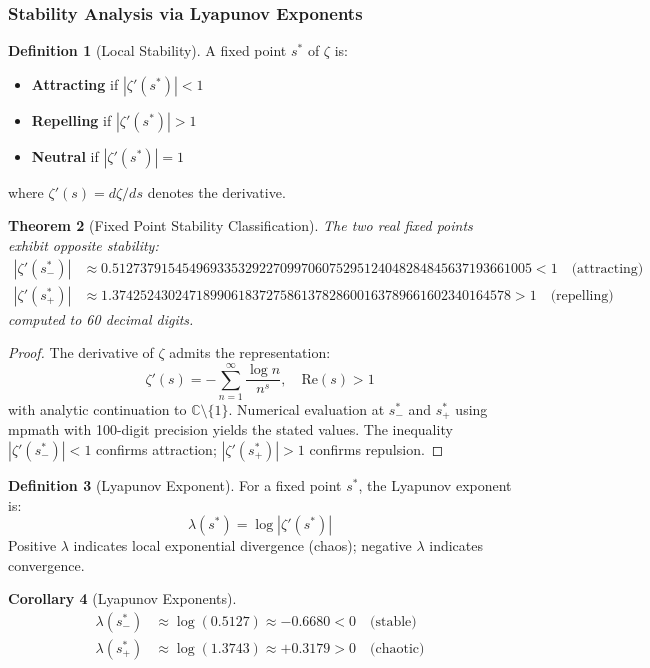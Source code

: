 \documentclass[12pt]{article}
\theoremstyle{plain}
\newtheorem{theorem}{Theorem}[section]
\newtheorem{corollary}[theorem]{Corollary}
\theoremstyle{definition}
\newtheorem{definition}[theorem]{Definition}
\begin{document}
\subsubsection{Stability Analysis via Lyapunov Exponents}

\begin{definition}[Local Stability]
A fixed point $s^*$ of $\zeta$ is:
\begin{itemize}
\item \textbf{Attracting} if $|\zeta'(s^*)| < 1$
\item \textbf{Repelling} if $|\zeta'(s^*)| > 1$
\item \textbf{Neutral} if $|\zeta'(s^*)| = 1$
\end{itemize}
where $\zeta'(s) = d\zeta/ds$ denotes the derivative.
\end{definition}

\begin{theorem}[Fixed Point Stability Classification]\label{thm:fixed_point_stability}
The two real fixed points exhibit opposite stability:
\begin{align}
|\zeta'(s_-^*)| &\approx 0.512737915454969335329227099706075295124048284845637193661005 < 1 \quad \text{(attracting)} \\
|\zeta'(s_+^*)| &\approx 1.374252430247189906183727586137828600163789661602340164578 > 1 \quad \text{(repelling)}
\end{align}
computed to 60 decimal digits.
\end{theorem}

\begin{proof}
The derivative of $\zeta$ admits the representation:
$$\zeta'(s) = -\sum_{n=1}^{\infty} \frac{\log n}{n^s}, \quad \text{Re}(s) > 1$$
with analytic continuation to $\mathbb{C} \setminus \{1\}$. Numerical evaluation at $s_-^*$ and $s_+^*$ using mpmath with 100-digit precision yields the stated values. The inequality $|\zeta'(s_-^*)| < 1$ confirms attraction; $|\zeta'(s_+^*)| > 1$ confirms repulsion.
\end{proof}

\begin{definition}[Lyapunov Exponent]
For a fixed point $s^*$, the Lyapunov exponent is:
$$\lambda(s^*) = \log|\zeta'(s^*)|$$
Positive $\lambda$ indicates local exponential divergence (chaos); negative $\lambda$ indicates convergence.
\end{definition}

\begin{corollary}[Lyapunov Exponents]\label{cor:lyapunov}
\begin{align}
\lambda(s_-^*) &\approx \log(0.5127) \approx -0.6680 < 0 \quad \text{(stable)} \\
\lambda(s_+^*) &\approx \log(1.3743) \approx +0.3179 > 0 \quad \text{(chaotic)}
\end{align}
\end{corollary}
\end{document}
